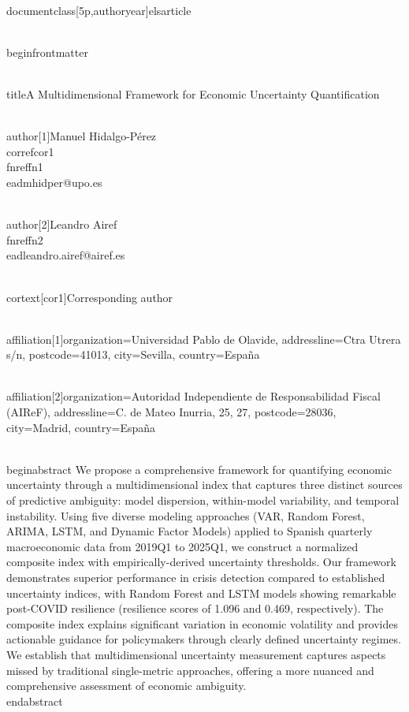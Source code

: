 \\documentclass[5p,authoryear]{elsarticle}
\begin{document}
\\begin{frontmatter}

\\title{A Multidimensional Framework for Economic Uncertainty Quantification}    

\\author[1]{Manuel Hidalgo-Pérez\\corref{cor1}%
 \\fnref{fn1}}
\\ead{mhidper@upo.es} 

\\author[2]{Leandro Airef\\fnref{fn2}}
\\ead{leandro.airef@airef.es}

\\cortext[cor1]{Corresponding author}

\\affiliation[1]{organization={Universidad Pablo de Olavide},
                addressline={Ctra Utrera s/n},
                postcode={41013},
                city={Sevilla},
                country={España}}

\\affiliation[2]{organization={Autoridad Independiente de Responsabilidad Fiscal (AIReF)},
                addressline={C. de Mateo Inurria, 25, 27},
                postcode={28036},
                city={Madrid},
                country={España}}

\\begin{abstract}
We propose a comprehensive framework for quantifying economic uncertainty through a multidimensional index that captures three distinct sources of predictive ambiguity: model dispersion, within-model variability, and temporal instability. Using five diverse modeling approaches (VAR, Random Forest, ARIMA, LSTM, and Dynamic Factor Models) applied to Spanish quarterly macroeconomic data from 2019Q1 to 2025Q1, we construct a normalized composite index with empirically-derived uncertainty thresholds. Our framework demonstrates superior performance in crisis detection compared to established uncertainty indices, with Random Forest and LSTM models showing remarkable post-COVID resilience (resilience scores of 1.096 and 0.469, respectively). The composite index explains significant variation in economic volatility and provides actionable guidance for policymakers through clearly defined uncertainty regimes. We establish that multidimensional uncertainty measurement captures aspects missed by traditional single-metric approaches, offering a more nuanced and comprehensive assessment of economic ambiguity.
\\end{abstract}
\end{document}

